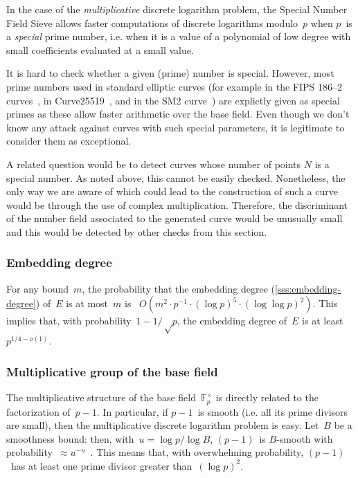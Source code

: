 \documentclass[twocolumn,letterpaper,10pt]{article}
\def\F{\mathbb{F}}
\begin{document}
In the case of the \emph{multiplicative} discrete logarithm problem,
the Special Number Field Sieve allows faster computations
of discrete logarithms modulo~$p$
when $p$~is a \emph{special} prime number,
i.e. when it is a value of a polynomial of low degree
with small coefficients evaluated at a small value.

It is hard to check whether a given (prime) number is special.
However, most prime numbers used in standard elliptic curves
(for example in the FIPS 186--2 curves~\cite{nist2000fips186-2},
in Curve25519~\cite{pkc2006bernstein},
and in the SM2 curve~\cite{oscca2010sm2})
are explictly given as special primes as these allow faster arithmetic
over the base field.
Even though we don't know any attack against curves with such special
parameters, it is legitimate to consider them as exceptional.

A related question would be to detect curves whose number of points $N$
is a special number.
As noted above, this cannot be easily checked.
Nonetheless, the only way we are aware of which could lead to the construction
of such a curve would be through the use of complex multiplication.
Therefore, the discriminant of the number field associated
to the generated curve would be unusually small and this would be detected by
other checks from this section.

\subsubsection{Embedding degree}

For any bound~$m$, the probability that
the embedding degree (\ref{sss:embedding-degree}) of~$E$ is at most~$m$
is~\cite{jc1998bk} $O(m^2 · p^{-1}·(\log p)^5·(\log\log p)^2)$.
This implies that, with probability~$1 - 1/√p$,
the embedding degree of~$E$ is at least~$p^{1/4 - o(1)}$.

\subsubsection{Multiplicative group of the base field}

The multiplicative structure of the base field~$\F_p^{×}$
is directly related to the factorization of~$p-1$.
In particular, if $p-1$~is smooth
(i.e. all its prime divisors are small),
then the multiplicative discrete logarithm problem is easy.
Let~$B$ be a smoothness bound: then, with~$u = \log p / \log B$,
$(p-1)$~is $B$-smooth with probability~$≈ u^{-u}$~\cite{jnt1983cep}.
This means that, with overwhelming probability,
$(p-1)$~has at least one prime divisor greater than~$(\log p)^2$.
\end{document}
